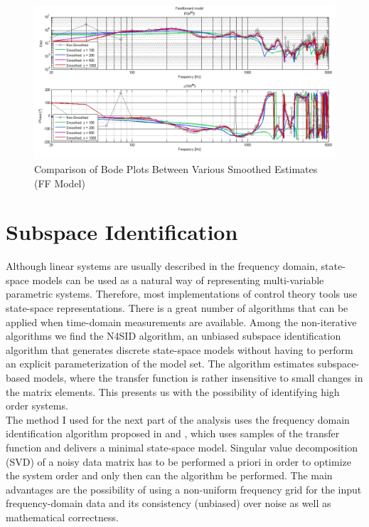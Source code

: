 \begin{figure}[h]
\centering
\includegraphics[width=1.0\textwidth]{pics/FF_Smoothing}
\caption{Comparison of Bode Plots Between Various Smoothed Estimates (FF Model)}
\label{fig:FF_Smoothing}
\end{figure}



\section{Subspace Identification}

Although linear systems are usually described in the frequency domain, state-space models can be used as a natural way of representing multi-variable parametric systems. Therefore, most implementations of control theory tools use state-space representations. There is a great number of algorithms that can be applied when time-domain measurements are available. Among the non-iterative algorithms we find the N4SID algorithm, an unbiased subspace identification algorithm that generates discrete state-space models without having to perform an explicit parameterization of the model set. The algorithm estimates subspace-based models, where the transfer function is rather insensitive to small changes in the matrix elements. This presents us with the possibility of identifying high order systems. \\

The method I used for the next part of the analysis uses the frequency domain identification algorithm proposed in \cite{mckelvey1996subspace} and \cite{van1994n4sid}, which uses samples of the transfer function and delivers a minimal state-space model. Singular value decomposition (SVD) of a noisy data matrix has to be performed a priori in order to optimize the system order and only then can the algorithm be performed. The main advantages are the possibility of using a non-uniform frequency grid for the input frequency-domain data and its consistency (unbiased) over noise as well as mathematical correctness. 


